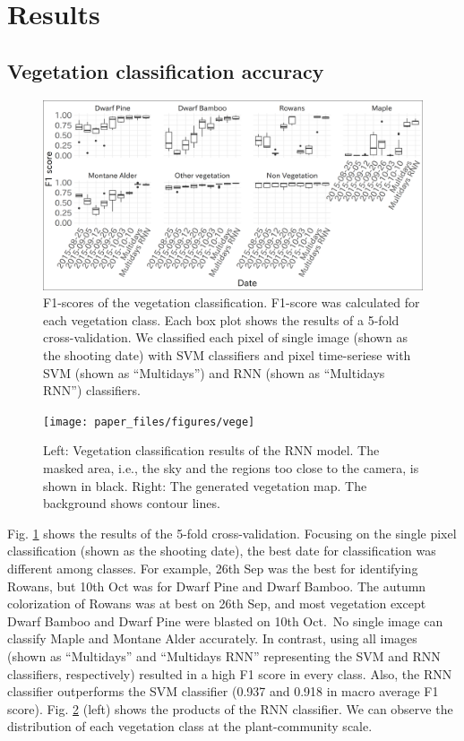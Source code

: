 \documentclass{article}
\begin{document}
\hypertarget{results}{%
\section{Results}\label{results}}

\hypertarget{vegetation-classification-accuracy}{%
\subsection{Vegetation classification accuracy}\label{vegetation-classification-accuracy}}



\begin{figure}
\includegraphics[width=1\linewidth]{paper_files/figures/cv} \caption{F1-scores of the vegetation classification. F1-score was calculated for each vegetation class. Each box plot shows the results of a 5-fold cross-validation. We classified each pixel of single image (shown as the shooting date) with SVM classifiers and pixel time-seriese with SVM (shown as ``Multidays'') and RNN (shown as ``Multidays RNN'') classifiers.}\label{fig:vegeacc}
\end{figure}



\begin{figure}
\texttt{[image: paper\_files/figures/vege]} \caption{Left: Vegetation classification results of the RNN model. The masked area, i.e., the sky and the regions too close to the camera, is shown in black. Right: The generated vegetation map. The background shows contour lines.}\label{fig:vegetation}
\end{figure}

Fig. \ref{fig:vegeacc} shows the results of the 5-fold cross-validation. Focusing on the single pixel classification (shown as the shooting date), the best date for classification was different among classes. For example, 26th Sep was the best for identifying Rowans, but 10th Oct was for Dwarf Pine and Dwarf Bamboo. The autumn colorization of Rowans was at best on 26th Sep, and most vegetation except Dwarf Bamboo and Dwarf Pine were blasted on 10th Oct.~No single image can classify Maple and Montane Alder accurately. In contrast, using all images (shown as ``Multidays'' and ``Multidays RNN'' representing the SVM and RNN classifiers, respectively) resulted in a high F1 score in every class. Also, the RNN classifier outperforms the SVM classifier (0.937 and 0.918 in macro average F1 score). Fig. \ref{fig:vegetation} (left) shows the products of the RNN classifier. We can observe the distribution of each vegetation class at the plant-community scale.
\end{document}
